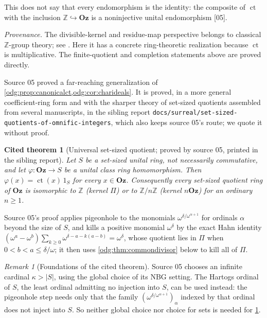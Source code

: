 \documentclass[11pt,oneside]{article}
\numberwithin{equation}{section}
\newtheorem{fact}[fact]{Cited theorem}
\theoremstyle{definition}
\theoremstyle{remark}
\newtheorem{remark}[remark]{Remark}
\newcommand{\Oz}{\mathbf{Oz}}
\newcommand{\Z}{\mathbb Z}
\newcommand{\ct}{\operatorname{ct}}
\newcommand{\src}[1]{\textup{\textsf{\small[#1]}}}
\newcommand{\status}[1]{\par\smallskip\noindent\textit{Provenance.} #1\par\smallskip}
\newcommand{\fn}[1]{\nolinkurl{#1}}
\begin{document}
This does not say that every endomorphism is the identity: the composite of
$\ct$ with the inclusion $\Z\hookrightarrow\Oz$ is a noninjective unital
endomorphism \src{05}.

\status{The divisible-kernel and residue-map perspective belongs to
classical $\Z$-group theory; see \cite[Sections 2 and 4]{JerabekMLQ}.
Here it has a concrete ring-theoretic realization because $\ct$ is
multiplicative. The finite-quotient and completion statements above are
proved directly.}

Source 05 proved a far-reaching generalization of
\cref{odg:prop:canonicalct,odg:cor:charideals}. It is proved, in a more
general coefficient-ring form and with the sharper theory of set-sized
quotients assembled from several manuscripts, in the sibling report
\fn{docs/surreal/set-sized-quotients-of-omnific-integers}, which also keeps
source 05's route; we quote it without proof.

\begin{fact}[Universal set-sized quotient; proved by source 05, printed in the sibling report]\label{odg:fact:settarget}
Let $S$ be a set-sized unital ring, not necessarily commutative, and let
$\varphi:\Oz\to S$ be a unital class ring homomorphism. Then
$\varphi(x)=\ct(x)\,1_S$ for every $x\in\Oz$. Consequently every set-sized
quotient ring of $\Oz$ is isomorphic to $\Z$ (kernel $\Pi$) or to $\Z/n\Z$
(kernel $n\Oz$) for an ordinary $n\ge1$.
\end{fact}

Source 05's proof applies pigeonhole to the monomials
$\omega^{\delta/\omega^{\alpha+1}}$ for ordinals $\alpha$ beyond the size of
$S$, and kills a positive monomial $\omega^\delta$ by the exact Hahn identity
$(\omega^a-\omega^b)\sum_{k\ge0}\omega^{\delta-a-k(a-b)}=\omega^\delta$, whose
quotient lies in $\Pi$ when $0<b<a\le\delta/\omega$; it then uses
\cref{odg:thm:commondivisor} below to kill all of $\Pi$.

\begin{remark}[Foundations of the cited theorem]\label{odg:rem:hartogs}
Source 05 chooses an infinite cardinal $\kappa>|S|$, using the global choice
of its NBG setting. The Hartogs ordinal of $S$, the least ordinal admitting no
injection into $S$, can be used instead: the pigeonhole step needs only that
the family $(\omega^{\delta/\omega^{\alpha+1}})_\alpha$ indexed by that ordinal
does not inject into $S$. So neither global choice nor choice for sets is
needed for \cref{odg:fact:settarget}.
\end{remark}
\end{document}
